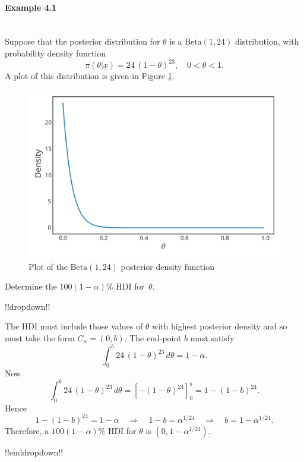 \paragraph{Example 4.1}{~\\
Suppose that the posterior distribution for $\theta$ is a
$\mathrm{Beta}(1,24)$ distribution, with probability density function
$$
\pi(\theta|\underline{x})=24\,(1-\theta)^{23}, \quad 0<\theta<1.
$$
A plot of this distribution is given in Figure \ref{fig:ci1}.
\begin{figure}[h!]

\includegraphics{images/betaposterior.svg}
\caption{Plot of the $\mathrm{Beta}(1,24)$ posterior density function}
\label{fig:ci1}

\end{figure}
Determine the $100(1-\alpha)\%$ HDI for~$\theta$.



!!dropdown!!

The HDI must include those values of $\theta$ with highest
    posterior density and so must take the form $C_\alpha=(0,b)$. The
    end-point $b$ must satisfy
    \begin{equation*}
    \int_0^b 24\,(1-\theta)^{23}\,d\theta = 1-\alpha.
    \end{equation*}
    Now
    \begin{equation*}
    \int_0^b 24\,(1-\theta)^{23}\,d\theta 
    = \left[-(1-\theta)^{24}\right]^b_0 = 1-(1-b)^{24}.
    \end{equation*}
    Hence
    $$
    1-(1-b)^{24}=1-\alpha \quad\Longrightarrow \quad 1-b=\alpha^{1/24}
    \quad\Longrightarrow \quad b=1-\alpha^{1/24}.
    $$
    Therefore, a $100(1-\alpha)\%$ HDI for $\theta$ is
    $(0,1-\alpha^{1/24})$.

!!enddropdown!!}



